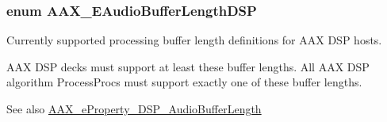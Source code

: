 \subsubsection[{A\+A\+X\+\_\+\+E\+Audio\+Buffer\+Length\+D\+S\+P}]{\setlength{\rightskip}{0pt plus 5cm}enum {\bf A\+A\+X\+\_\+\+E\+Audio\+Buffer\+Length\+D\+S\+P}}\label{a00206_ab33e0f1ecf04ca4161fa8d8de5845d67}


Currently supported processing buffer length definitions for A\+A\+X D\+S\+P hosts. 

A\+A\+X D\+S\+P decks must support at least these buffer lengths. All A\+A\+X D\+S\+P algorithm Process\+Procs must support exactly one of these buffer lengths.

\begin{DoxySeeAlso}{See also}
\hyperlink{a00283_a6571f4e41a5dd06e4067249228e2249ea09fbd1cbcae0e86ad81005258dc1b67e}{A\+A\+X\+\_\+e\+Property\+\_\+\+D\+S\+P\+\_\+\+Audio\+Buffer\+Length} 
\end{DoxySeeAlso}
